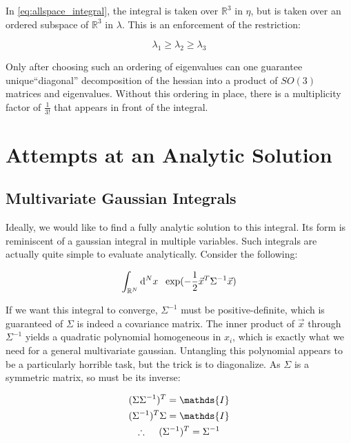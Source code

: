 \documentclass[10pt,letterpaper]{article}
\def\d{{\rm d}}  %
\begin{document}
In \ref{eq:allspace_integral}, the integral is taken over $\mathbb{R}^3$ in $\eta$, but is taken over an ordered subspace of $\mathbb{R}^3$ in $\lambda$. This is an enforcement of the restriction:

\begin{equation} \label{eq:ordering}
\lambda_1 \geq \lambda_2 \geq \lambda_3
\end{equation}

Only after choosing such an ordering of eigenvalues can one guarantee unique``diagonal'' decomposition of the hessian into a product of $SO(3)$ matrices and eigenvalues. Without this ordering in place, there is a multiplicity factor of $\frac{1}{3!}$ that appears in front of the integral.

\section{Attempts at an Analytic Solution}

\subsection{Multivariate Gaussian Integrals}

Ideally, we would like to find a fully analytic solution to this integral. Its form is reminiscent of a gaussian integral in multiple variables. Such integrals are actually quite simple to evaluate analytically. Consider the following:

\begin{equation} \label{eq:multigaus}
\int_{\mathbb{R}^N} \d^N x \hspace{0.5pc} \exp(-\frac{1}{2} \vec{x}^T \Sigma^{-1} \vec{x})
\end{equation}

If we want this integral to converge, $\Sigma^{-1}$ must be positive-definite, which is guaranteed of $\Sigma$ is indeed a covariance matrix. The inner product of $\vec{x}$ through $\Sigma^{-1}$ yields a quadratic polynomial homogeneous in $x_i$, which is exactly what we need for a general multivariate gaussian. Untangling this polynomial appears to be a particularly horrible task, but the trick is to diagonalize.
As $\Sigma$ is a symmetric matrix, so must be its inverse:

\begin{gather*}
(\Sigma \Sigma^{-1})^T = \mathds{I} \\
(\Sigma^{-1})^T \Sigma = \mathds{I} \\
\therefore \hspace{1pc}  (\Sigma^{-1})^T = \Sigma^{-1}
\end{gather*}
\end{document}
